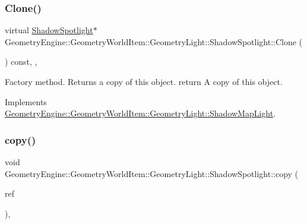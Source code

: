 \subsubsection{\texorpdfstring{Clone()}{Clone()}}
{\footnotesize\ttfamily virtual \mbox{\hyperlink{class_geometry_engine_1_1_geometry_world_item_1_1_geometry_light_1_1_shadow_spotlight}{Shadow\+Spotlight}}$\ast$ Geometry\+Engine\+::\+Geometry\+World\+Item\+::\+Geometry\+Light\+::\+Shadow\+Spotlight\+::\+Clone (\begin{DoxyParamCaption}{ }\end{DoxyParamCaption}) const\hspace{0.3cm}{\ttfamily [inline]}, {\ttfamily [override]}, {\ttfamily [virtual]}}

Factory method. Returns a copy of this object. return A copy of this object. 

Implements \mbox{\hyperlink{class_geometry_engine_1_1_geometry_world_item_1_1_geometry_light_1_1_shadow_map_light_a48eb6af2e6bb8487568ee4265fbc49ee}{Geometry\+Engine\+::\+Geometry\+World\+Item\+::\+Geometry\+Light\+::\+Shadow\+Map\+Light}}.

\mbox{\label{class_geometry_engine_1_1_geometry_world_item_1_1_geometry_light_1_1_shadow_spotlight_a675183375855625b787de617239aa6fb}} 
\subsubsection{\texorpdfstring{copy()}{copy()}}
{\footnotesize\ttfamily void Geometry\+Engine\+::\+Geometry\+World\+Item\+::\+Geometry\+Light\+::\+Shadow\+Spotlight\+::copy (\begin{DoxyParamCaption}\item[{const \mbox{\hyperlink{class_geometry_engine_1_1_geometry_world_item_1_1_geometry_light_1_1_shadow_spotlight}{Shadow\+Spotlight}} \&}]{ref }\end{DoxyParamCaption})\hspace{0.3cm}{\ttfamily [protected]}, {\ttfamily [virtual]}}

